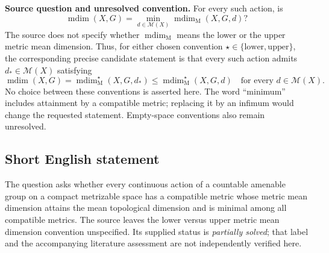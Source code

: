 \documentclass[11pt]{article}
\begin{document}
\textbf{Source question and unresolved convention.} For every such action, is
\[
\operatorname{mdim}(X,G)
=\min_{d\in\mathcal M(X)}\operatorname{mdim}_{\mathrm M}(X,G,d)?
\]
The source does not specify whether \(\operatorname{mdim}_{\mathrm M}\) means the lower or the upper metric mean dimension. Thus, for either chosen convention \(\star\in\{\mathrm{lower},\mathrm{upper}\}\), the corresponding precise candidate statement is that every such action admits \(d_*\in\mathcal M(X)\) satisfying
\[
\operatorname{mdim}(X,G)
=\operatorname{mdim}_{\mathrm M}^{\star}(X,G,d_*)
\leq\operatorname{mdim}_{\mathrm M}^{\star}(X,G,d)
\quad\text{for every }d\in\mathcal M(X).
\]
No choice between these conventions is asserted here. The word ``minimum'' includes attainment by a compatible metric; replacing it by an infimum would change the requested statement. Empty-space conventions also remain unresolved.
\subsection{Short English statement}
The question asks whether every continuous action of a countable amenable group on a compact metrizable space has a compatible metric whose metric mean dimension attains the mean topological dimension and is minimal among all compatible metrics. The source leaves the lower versus upper metric mean dimension convention unspecified. Its supplied status is \emph{partially solved}; that label and the accompanying literature assessment are not independently verified here.
\end{document}
